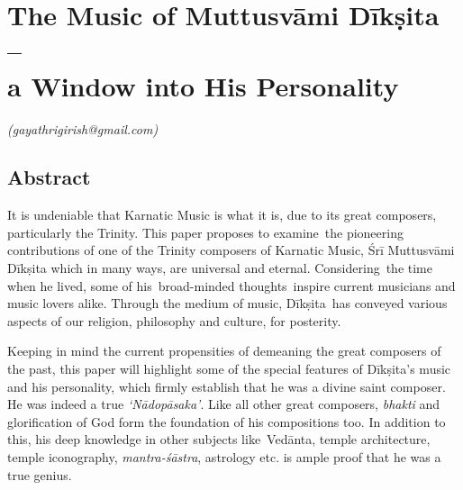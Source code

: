 \chapter{The Music of Muttusvāmi Dīkṣita –\\ a Window into His Personality}\label{chapter1}


\vspace{-.3cm}


\begin{flushright}
\textit{(gayathrigirish@gmail.com)}
\end{flushright}


\section*{Abstract}

It is undeniable that Karnatic Music is what it is, due to its great composers, particularly the Trinity. This paper proposes to examine the pioneering contributions of one of the Trinity composers of Karnatic Music, Śrī Muttusvāmi Dīkṣita which in many ways, are universal and eternal. Considering the time when he lived, some of his broad-minded thoughts inspire current musicians and music lovers alike. Through the medium of music, Dīkṣita has conveyed various aspects of our religion, philosophy and culture, for posterity.

Keeping in mind the current propensities of demeaning the great composers of the past, this paper will highlight some of the special features of Dīkṣita’s music and his personality, which firmly establish that he was a divine saint composer. He was indeed a true \textit{‘Nādopāsaka’}. Like all other great composers, \textit{bhakti} and glorification of God form the foundation of his compositions too. In addition to this, his deep knowledge in other subjects like Vedānta, temple architecture, temple iconography, \textit{mantra-śāstra}, astrology etc. is ample proof that he was a true genius. 

